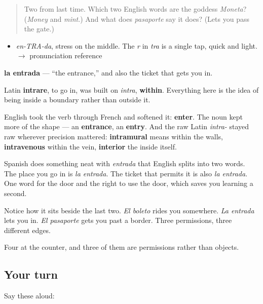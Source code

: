 \label{lesson:ES-C313-entrada}



\begin{quote}
Two from last time. Which two English words are the goddess \emph{Moneta}? (\emph{Money} and \emph{mint}.) And what does \emph{pasaporte} say it does? (Lets you pass the gate.)
\end{quote}

\begin{sounds}
\begin{itemize}
\raggedright
  \item \emph{en-TRA-da}, stress on the middle. The \emph{r} in \emph{tra} is a single tap, quick and light. $\to$ pronunciation reference
\end{itemize}
\end{sounds}

\begin{cousinweb}
\textbf{la entrada} — \textquotedblleft{}the entrance,\textquotedblright{} and also the ticket that gets you in.

Latin \textbf{intrare}, to go in, was built on \emph{intra}, \textbf{within}. Everything here is the idea of being inside a boundary rather than outside it.

English took the verb through French and softened it: \textbf{enter}. The noun kept more of the shape — an \textbf{entrance}, an \textbf{entry}. And the raw Latin \emph{intra-} stayed raw wherever precision mattered: \textbf{intramural} means within the walls, \textbf{intravenous} within the vein, \textbf{interior} the inside itself.

Spanish does something neat with \emph{entrada} that English splits into two words. The place you go in is \emph{la entrada}. The ticket that permits it is also \emph{la entrada}. One word for the door and the right to use the door, which saves you learning a second.

Notice how it sits beside the last two. \emph{El boleto} rides you somewhere. \emph{La entrada} lets you in. \emph{El pasaporte} gets you past a border. Three permissions, three different edges.
\end{cousinweb}

\begin{grammarlens}[title={What you've built}]
Four at the counter, and three of them are permissions rather than objects.
\end{grammarlens}

\subsection*{Your turn}
Say these aloud:

